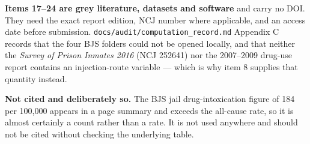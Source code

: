 \textbf{Items 17--24 are grey literature, datasets and software} and carry no DOI. They need the exact report edition, NCJ number where applicable, and an access date before submission. \texttt{docs/audit/computation\_record.md} Appendix C records that the four BJS folders could not be opened locally, and that neither the \emph{Survey of Prison Inmates 2016} (NCJ 252641) nor the 2007--2009 drug-use report contains an injection-route variable --- which is why item 8 supplies that quantity instead.

\textbf{Not cited and deliberately so.} The BJS jail drug-intoxication figure of 184 per 100,000 appears in a page summary and exceeds the all-cause rate, so it is almost certainly a count rather than a rate. It is not used anywhere and should not be cited without checking the underlying table.
